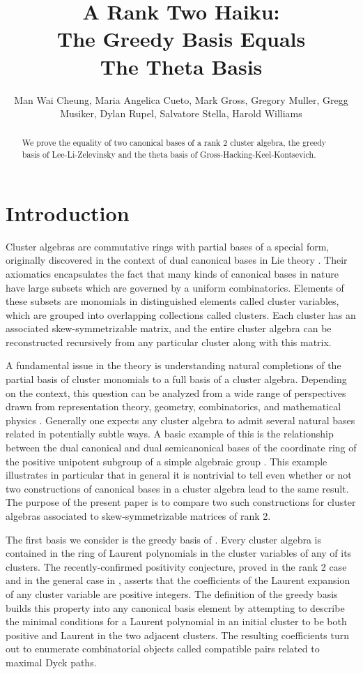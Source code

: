 \documentclass[11pt]{amsart}
\title[The Greedy Basis is the Theta Basis]{A Rank Two Haiku:\\ The Greedy Basis Equals \\ The Theta Basis}
\author[1]{Man Wai Cheung, Maria Angelica Cueto, Mark Gross, 
Gregory Muller, Gregg Musiker, Dylan Rupel, Salvatore Stella, Harold Williams}
\theoremstyle{remark}
\numberwithin{equation}{section}
\begin{document}
\begin{abstract}
We prove the equality of two canonical bases of a rank 2 cluster algebra, the greedy basis of Lee-Li-Zelevinsky and the theta basis of Gross-Hacking-Keel-Kontsevich.
\end{abstract}

\maketitle

\section{Introduction}

Cluster algebras are commutative rings with partial bases of a special form, originally discovered in the context of dual canonical bases in Lie theory \cite{FZ}.  Their axiomatics encapsulates the fact that many kinds of canonical bases in nature have large subsets which are governed by a uniform combinatorics.  Elements of these subsets are monomials in distinguished elements called cluster variables, which are grouped into overlapping collections called clusters.  Each cluster has an associated skew-symmetrizable matrix, and the entire cluster algebra can be reconstructed recursively from any particular cluster along with this matrix.

A fundamental issue in the theory is understanding natural completions of the partial basis of cluster monomials to a full basis of a cluster algebra.  Depending on the context, this question can be analyzed from a wide range of perspectives drawn from representation theory, geometry, combinatorics, and mathematical physics \cite{Dup,KQ,FG,MSW,BZ,Rup,GMN}.  Generally one expects any cluster algebra to admit several natural bases related in potentially subtle ways.  A basic example of this is the relationship between the dual canonical and dual semicanonical bases of the coordinate ring of the positive unipotent subgroup of a simple algebraic group \cite{GLS}.  This example illustrates in particular that in general it is nontrivial to tell even whether or not two constructions of canonical bases in a cluster algebra lead to the same result.  The purpose of the present paper is to compare two such constructions for cluster algebras associated to skew-symmetrizable matrices of rank 2.  

The first basis we consider is the greedy basis of \cite{LLZ}.  Every cluster algebra is contained in the ring of Laurent polynomials in the cluster variables of any of its clusters.  The recently-confirmed positivity conjecture, proved in the rank 2 case \cite{LS,Rup2} and in the general case in \cite{LS2,GHKK}, asserts that the coefficients of the Laurent expansion of any cluster variable are positive integers.  The definition of the greedy basis builds this property into any canonical basis element by attempting to describe the minimal conditions for a Laurent polynomial in an initial cluster to be both positive and Laurent in the two adjacent clusters.  The resulting coefficients turn out to enumerate combinatorial objects called compatible pairs related to maximal Dyck paths.  
\end{document}
